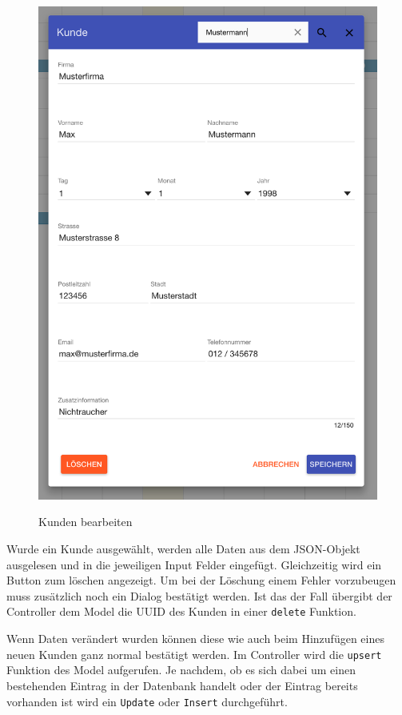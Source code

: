 \begin{figure}[H]
\begin{minipage}[t]{0.49\linewidth}
        \includegraphics[width=\linewidth]{images/frontend_customer_edit.png}
        \label{frontend_customer_edit}
        \caption{Kunden bearbeiten}
    \end{minipage}
\end{figure}

Wurde ein Kunde ausgewählt, werden alle Daten aus dem JSON-Objekt ausgelesen und in die jeweiligen Input Felder eingefügt. Gleichzeitig wird ein Button zum löschen angezeigt. Um bei der Löschung einem Fehler vorzubeugen muss zusätzlich noch ein Dialog bestätigt werden. Ist das der Fall übergibt der Controller dem Model die UUID des Kunden in einer \texttt{delete} Funktion. 

Wenn Daten verändert wurden können diese wie auch beim Hinzufügen eines neuen Kunden ganz normal bestätigt werden. Im Controller wird die \texttt{upsert} Funktion des Model aufgerufen. Je nachdem, ob es sich dabei um einen bestehenden Eintrag in der Datenbank handelt oder der Eintrag bereits vorhanden ist wird ein \texttt{Update} oder \texttt{Insert} durchgeführt. 


